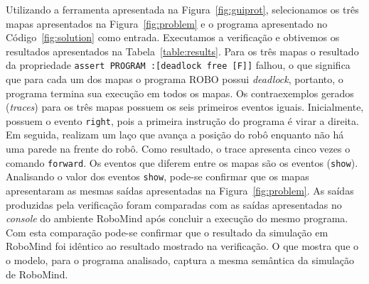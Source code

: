 Utilizando a ferramenta apresentada na Figura~\ref{fig:guiprot}, selecionamos os três mapas apresentados na Figura~\ref{fig:problem} e o programa apresentado no Código~\ref{fig:solution} como entrada. Executamos a verificação e obtivemos os resultados apresentados na Tabela~\ref{table:results}. Para os três mapas o resultado da propriedade \texttt{assert PROGRAM :[deadlock free [F]]} falhou, o que significa que para cada um dos mapas o programa ROBO possui \textit{deadlock}, portanto, o programa termina sua execução em todos os mapas. Os contraexemplos gerados (\textit{traces}) para os três mapas possuem os seis primeiros eventos iguais.  Inicialmente, possuem o evento \texttt{right}, pois a primeira instrução do programa é virar a direita. Em seguida, realizam um laço que avança a posição do robô enquanto não há uma parede na frente do robô. Como resultado, o trace apresenta cinco vezes o comando \texttt{forward}. Os eventos que diferem entre os mapas são os eventos (\texttt{show}). Analisando o valor dos eventos \texttt{show}, pode-se confirmar que os mapas apresentaram as mesmas saídas apresentadas na Figura~\ref{fig:problem}. As saídas produzidas pela verificação foram comparadas com as saídas apresentadas no \textit{console} do ambiente RoboMind após concluir a execução do mesmo programa. Com esta comparação pode-se confirmar que o resultado da simulação em RoboMind foi idêntico ao resultado mostrado na verificação. O que mostra que o o modelo, para o programa analisado, captura a mesma semântica da simulação de RoboMind.

\begin{table}[H]
\caption{Resultado da verificação usando a  ferramenta proposta}
\label{table:results}
\end{table}

